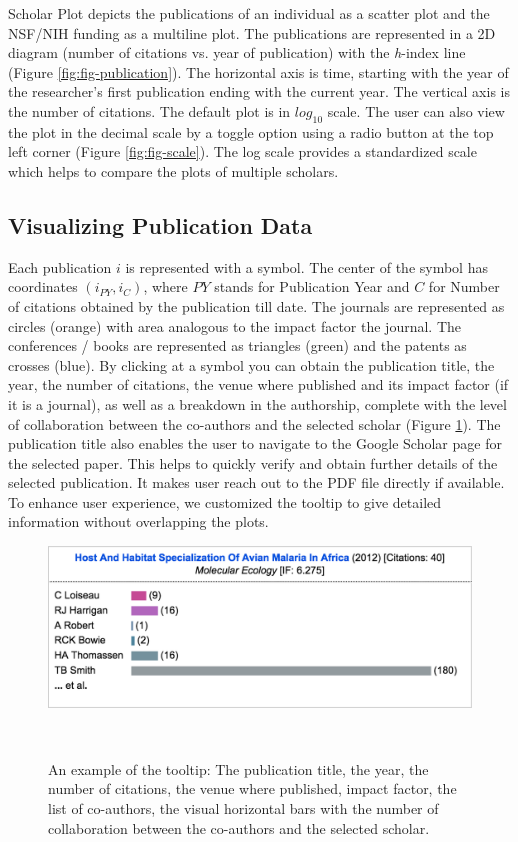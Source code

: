 Scholar Plot depicts the publications of an individual as a scatter plot and the NSF/NIH funding as a multiline plot. The publications are represented in a 2D diagram (number of citations vs. year of publication) with the {\it h}-index line (Figure \ref{fig:fig-publication}). The horizontal axis is time, starting with the year of the researcher's first publication ending with the current year. The vertical axis is the number of citations. The default plot is in $log_{10}$ scale. The user can also view the plot in the decimal scale by a toggle option using a radio button at the top left corner (Figure \ref{fig:fig-scale}). The log scale provides a standardized scale which helps to compare the plots of multiple scholars.



\subsection{Visualizing Publication Data}
Each publication $i$ is represented with a symbol. The center of the symbol has coordinates $(i_{PY}, i_{C})$, where $PY$ stands for Publication Year and $C$ for Number of citations obtained by the publication till date. The journals are represented as circles (orange) with area analogous to the impact factor the journal. The conferences / books are represented as triangles (green) and the patents as crosses (blue). By clicking at a symbol you can obtain the publication title, the year, the number of citations, the venue where published and its impact factor (if it is a journal), as well as a breakdown in the authorship, complete with the level of collaboration between the co-authors and the selected scholar (Figure \ref{fig:fig-tooltip}). The publication title also enables the user to navigate to the Google Scholar page for the selected paper. This helps to quickly verify and obtain further details of the selected publication. It makes user reach out to the PDF file directly if available. To enhance user experience, we customized the tooltip to give detailed information without overlapping the plots.

\begin{figure}[H]
\centering
  \includegraphics[width=1\columnwidth]{figures/fig_tooltip}
  \caption{An example of the tooltip: The publication title, the year, the number of citations, the venue where published, impact factor, the list of co-authors, the visual horizontal bars with the number of collaboration between the co-authors and the selected scholar.}~\label{fig:fig-tooltip}
\end{figure}

